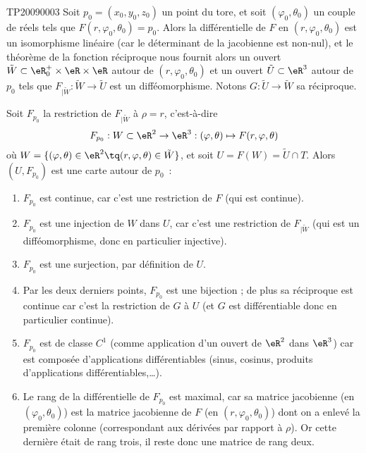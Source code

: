 \begin{corrige}{TP20090003}
	Soit $p_0 = (x_0,y_0,z_0)$ un point du tore, et soit $(\varphi_0,
		\theta_0)$ un couple de réels tels que $F(r, \varphi_0, \theta_0) =
		p_0$. Alors la différentielle de $F$ en $(r, \varphi_0, \theta_0)$ est un
	isomorphisme linéaire (car le déterminant de la jacobienne est
	non-nul), et le théorème de la fonction réciproque nous fournit alors
	un ouvert $\tilde W \subset \eR^+_0 \times \eR \times \eR$ autour de
	$(r, \varphi_0, \theta_0)$ et un ouvert $\tilde U \subset \eR^3$ autour
	de $p_0$ tels que $F_{| \tilde W} : \tilde W \to \tilde U$ est un
	difféomorphisme. Notons $G : \tilde U \to \tilde W$ sa réciproque.

	Soit $F_{p_0}$ la restriction de $F_{| \tilde W}$ à $\rho = r$, c'est-à-dire
	\begin{equation*}
		F_{p_0} : W \subset \eR^2 \to \eR^3 : (\varphi,\theta) \mapsto F(r,\varphi,\theta)
	\end{equation*}
	où $W = \{ (\varphi,\theta) \in \eR^2 \tq (r,\varphi,\theta) \in \tilde
		W\}$, et soit $U = F(W) = \tilde U \cap T$. Alors $(U, F_{p_0})$ est
	une carte autour de $p_0$~:
	\begin{enumerate}
		\item $F_{p_0}$ est continue, car c'est une restriction de $F$ (qui est
		      continue).
		\item $F_{p_0}$ est une injection de $W$ dans $U$, car c'est une
		      restriction de $F_{| \tilde W}$ (qui est un difféomorphisme,
		      donc en particulier injective).
		\item $F_{p_0}$ est une surjection, par définition de $U$.
		\item Par les deux derniers points, $F_{p_0}$ est une bijection ; de
		      plus sa réciproque est continue car c'est la restriction de $G$ à
		      $U$ (et $G$ est différentiable donc en particulier continue).
		\item $F_{p_0}$ est de classe $C^1$ (comme application d'un ouvert de
		      $\eR^2$ dans $\eR^3$) car est composée d'applications
		      différentiables (sinus, cosinus, produits d'applications
		      différentiables,\dots).
		\item Le rang de la différentielle de $F_{p_0}$ est maximal, car sa
		      matrice jacobienne (en $(\varphi_0,\theta_0)$) est la matrice jacobienne de $F$
		      (en $(r,\varphi_0,\theta_0)$) dont on a enlevé la première colonne
		      (correspondant aux dérivées par rapport à $\rho$). Or cette dernière
		      était de rang trois, il reste donc une matrice de rang deux.
	\end{enumerate}


\end{corrige}
